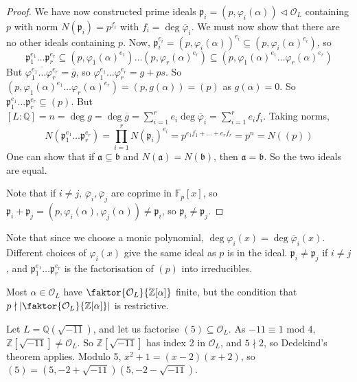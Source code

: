 \begin{proof}
    We have now constructed prime ideals \( \mathfrak p_i = (p, \varphi_i(\alpha)) \triangleleft \mathcal O_L \) containing \( p \) with norm \( N(\mathfrak p_i) = p^{f_i} \) with \( f_i = \deg \overline\varphi_i \).
    We must now show that there are no other ideals containing \( p \).
    Now, \( \mathfrak p_i^{e_i} = (p, \varphi_i(\alpha))^{e_i} \subseteq (p, \varphi_i(\alpha)^{e_i}) \), so
    \[ \mathfrak p_1^{e_1} \dots \mathfrak p_r^{e_r} \subseteq (p, \varphi_1(\alpha)^{e_1}) \dots (p, \varphi_r(\alpha)^{e_r}) \subseteq (p, \varphi_1(\alpha)^{e_1} \dots \varphi_r(\alpha)^{e_r}) \]
    But \( \overline{\varphi_1^{e_1} \dots \varphi_r^{e_r}} = \overline g \), so \( \varphi_1^{e_1} \dots \varphi_r^{e_r} = g + p s \).
    So \( (p, \varphi_1(\alpha)^{e_1} \dots \varphi_r(\alpha)^{e_r}) = (p, g(\alpha)) = (p) \) as \( g(\alpha) = 0 \).
    So \( \mathfrak p_1^{e_1} \dots \mathfrak p_r^{e_r} \subseteq (p) \).
    But \( [L:\mathbb Q] = n = \deg g = \deg \overline g = \sum_{i=1}^r e_i \deg \overline\varphi_i = \sum_{i=1}^r e_i f_i \).
    Taking norms,
    \[ N(\mathfrak p_1^{e_1} \dots \mathfrak p_r^{e_r}) = \prod_{i=1}^r N(\mathfrak p_i)^{e_i} = p^{e_1 f_1 + \dots + e_r f_r} = p^n = N((p)) \]
    One can show that if \( \mathfrak a \subseteq \mathfrak b \) and \( N(\mathfrak a) = N(\mathfrak b) \), then \( \mathfrak a = \mathfrak b \).
    So the two ideals are equal.

    Note that if \( i \neq j \), \( \overline \varphi_i, \overline \varphi_j \) are coprime in \( \mathbb F_p[x] \), so \( \mathfrak p_i + \mathfrak p_j = (p, \varphi_i(\alpha), \varphi_j(\alpha)) \neq \mathfrak p_i \), so \( \mathfrak p_i \neq \mathfrak p_j \).
\end{proof}
Note that since we choose a monic polynomial, \( \deg \varphi_i(x) = \deg \overline \varphi_i(x) \).
Different choices of \( \varphi_i(x) \) give the same ideal as \( p \) is in the ideal.
\( \mathfrak p_i \neq \mathfrak p_j \) if \( i \neq j \), and \( \mathfrak p_1^{e_1} \dots \mathfrak p_r^{e_r} \) is the factorisation of \( (p) \) into irreducibles.
\begin{remark}
    Most \( \alpha \in \mathcal O_L \) have \( \faktor{\mathcal O_L}{\mathbb Z[\alpha]} \) finite, but the condition that \( p \nmid \abs{\faktor{\mathcal O_L}{\mathbb Z[\alpha]}} \) is restrictive.
\end{remark}
\begin{example}
    Let \( L = \mathbb Q(\sqrt{-11}) \), and let us factorise \( (5) \subseteq \mathcal O_L \).
    As \( -11 \equiv 1 \text{ mod } 4 \), \( \mathbb Z[\sqrt{-11}] \neq \mathcal O_L \).
    So \( \mathbb Z[\sqrt{-11}] \) has index 2 in \( \mathcal O_L \), and \( 5 \nmid 2 \), so Dedekind's theorem applies.
    Modulo 5, \( x^2 + 1 = (x-2)(x+2) \), so \( (5) = (5, -2 + \sqrt{-11})(5, -2 - \sqrt{-11}) \).
\end{example}
